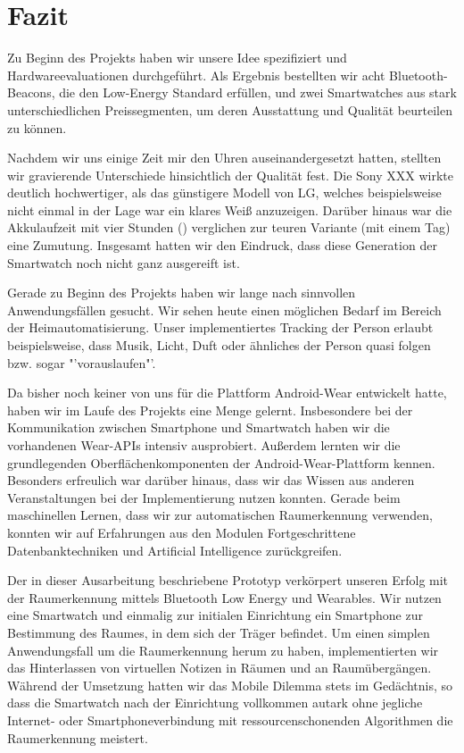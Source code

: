 \section{Fazit}
Zu Beginn des Projekts haben wir unsere Idee spezifiziert und Hardwareevaluationen durchgeführt. Als Ergebnis bestellten wir acht Bluetooth-Beacons, die den Low-Energy Standard erfüllen, und zwei Smartwatches aus stark unterschiedlichen Preissegmenten, um deren Ausstattung und Qualität beurteilen zu können.

Nachdem wir uns einige Zeit mir den Uhren auseinandergesetzt hatten, stellten wir gravierende Unterschiede hinsichtlich der Qualität fest. Die Sony XXX wirkte deutlich hochwertiger, als das günstigere Modell  von LG, welches beispielsweise nicht einmal in der Lage war ein klares Weiß anzuzeigen. Darüber hinaus war die Akkulaufzeit mit vier Stunden () verglichen zur teuren Variante (mit einem Tag) eine Zumutung. Insgesamt hatten wir den Eindruck, dass diese Generation der Smartwatch noch nicht ganz ausgereift ist. 

Gerade zu Beginn des Projekts haben wir lange nach sinnvollen Anwendungsfällen gesucht. Wir sehen heute einen möglichen Bedarf im Bereich der Heimautomatisierung. Unser implementiertes Tracking der Person erlaubt beispielsweise, dass Musik, Licht, Duft oder ähnliches der Person quasi folgen bzw. sogar "'vorauslaufen"'.

Da bisher noch keiner von uns für die Plattform Android-Wear entwickelt hatte, haben wir im Laufe des Projekts eine Menge gelernt. Insbesondere bei der Kommunikation zwischen Smartphone und Smartwatch haben wir die vorhandenen Wear-APIs intensiv ausprobiert. Außerdem lernten wir die grundlegenden Oberflächenkomponenten der Android-Wear-Plattform kennen. Besonders erfreulich war darüber hinaus, dass wir das Wissen aus anderen Veranstaltungen bei der Implementierung nutzen konnten. Gerade beim maschinellen Lernen, dass wir zur automatischen Raumerkennung verwenden, konnten wir auf Erfahrungen aus den Modulen Fortgeschrittene Datenbanktechniken und Artificial Intelligence zurückgreifen.

Der in dieser Ausarbeitung beschriebene Prototyp verkörpert unseren Erfolg mit der Raumerkennung mittels Bluetooth Low Energy und Wearables. Wir nutzen eine Smartwatch und einmalig zur initialen Einrichtung ein Smartphone zur Bestimmung des Raumes, in dem sich der Träger befindet. Um einen simplen Anwendungsfall um die Raumerkennung herum zu haben, implementierten wir das Hinterlassen von virtuellen Notizen in Räumen und an Raumübergängen. Während der Umsetzung hatten wir das Mobile Dilemma stets im Gedächtnis, so dass die Smartwatch nach der Einrichtung vollkommen autark ohne jegliche Internet- oder Smartphoneverbindung mit ressourcenschonenden Algorithmen die Raumerkennung meistert.

